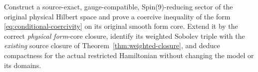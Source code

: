 \begin{openproblem}
\label{op:form-compactness}
Construct a source-exact, gauge-compatible, Spin(9)-reducing sector
of the original physical Hilbert space and prove a coercive inequality
of the form \eqref{eq:conditional-coercivity} on its original smooth
form core. Extend it by the correct \emph{physical form}-core closure,
identify its weighted Sobolev triple with the \emph{existing} source
closure of Theorem~\ref{thm:weighted-closure}, and deduce compactness
for the actual restricted Hamiltonian without changing the model or
its domains.
\end{openproblem}
